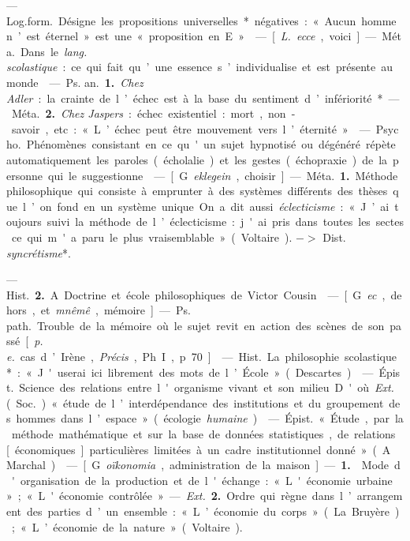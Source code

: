 
	\begin{itemize}[leftmargin=1cm, label=, itemsep=1pt]

 — \si{Log.form.} Désigne les propositions universelles* négatives :
« Aucun homme n’est éternel » est une « proposition en E ».

 — [{\it L.} {\it ecce}, voici] — \si{Méta.} Dans
le {\it lang. scolastique} : ce qui fait qu’une
essence s’individualise et est présente au monde.

 — \si{Ps. an.} {\bf 1.} {\it Chez Adler} : la
crainte de l’échec est à la base du sentiment d’infériorité*. — \si{Méta.}
 {\bf 2.} {\it Chez Jaspers} : échec existentiel :
mort, non-savoir, etc. : « L’échec peut être mouvement vers l’éternité. »

 — \si{Psycho.}
Phénomènes consistant en ce qu'un sujet hypnotisé ou dégénéré répète
automatiquement les paroles (écholalie) et les gestes (échopraxie) de la
personne qui le suggestionne.

 — [G. {\it eklegein}, choisir] —
\si{Méta.} {\bf 1.} Méthode philosophique qui
consiste à emprunter à des systèmes différents des thèses que l’on fond
en un système unique. On a dit aussi
{\it éclecticisme} : « J’ai toujours suivi la
méthode de l’éclecticisme : j'ai pris dans toutes les sectes ce qui m'a
paru le plus vraisemblable » (Voltaire). $->$ Dist. {\it syncrétisme}*.

— \si{Hist.} {\bf 2.} A. Doctrine et école
philosophiques de Victor Cousin.

 — [G. {\it ec}, dehors, et {\it mnêmê},
mémoire] — \si{Ps. path.} Trouble de la mémoire
où le sujet revit en action
des scènes de son passé [{\it p. e.} cas
d’Irène,  {\it Précis}, Ph. I, p. 70].

 — \si{Hist.} La philosophie scolastique* :
« J'userai ici librement des mots de l’École » (Descartes).

 — \si{Épist.} Science des relations entre l'organisme vivant et
son milieu. D'où {\it Ext.} (\si{Soc.}) « étude
de l’interdépendance des institutions
et du groupement des hommes dans
l’espace » (écologie {\it humaine}).

 — \si{Épist.} « Étude, par la
méthode mathématique et sur la
base de données statistiques, de
relations [économiques] particulières limitées à un cadre institutionnel donné ». (A. Marchal).

 — [G. {\it oïkonomia}, administration de la maison]
— {\bf 1.}  Mode d'organisation de la production et
de l'échange : « L'économie urbaine » ;
« L'économie contrôlée ». — {\it Ext.} {\bf 2.}
Ordre qui règne dans l’arrangement
des parties d’un ensemble : « L’économie du corps » (La Bruyère);
« L’économie de la nature » (Voltaire).


\end{itemize}
